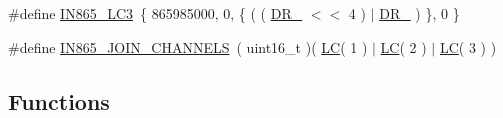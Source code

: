 \begin{DoxyCompactItemize}
\item 
\#define \hyperlink{group__REGIONIN865_ga6808f21aa6b28f6d31d32bc44c3ee52a}{I\+N865\+\_\+\+L\+C3}~\{ 865985000, 0, \{ ( ( \hyperlink{group__REGION_ga872e12c82020c02a7f70a1c6ed1375df}{D\+R\+\_} $<$$<$ 4 ) $\vert$ \hyperlink{group__REGION_ga6c4ef966b4f3d5eb7597b087f2b97095}{D\+R\+\_} ) \}, 0 \}
\item 
\#define \hyperlink{group__REGIONIN865_ga61dadd0a86c40e6fd4d47ffb08a1305e}{I\+N865\+\_\+\+J\+O\+I\+N\+\_\+\+C\+H\+A\+N\+N\+E\+LS}~( uint16\+\_\+t )( \hyperlink{group__REGION_ga12fa17e5c1016e01a9d82c25027deb1b}{LC}( 1 ) $\vert$ \hyperlink{group__REGION_ga12fa17e5c1016e01a9d82c25027deb1b}{LC}( 2 ) $\vert$ \hyperlink{group__REGION_ga12fa17e5c1016e01a9d82c25027deb1b}{LC}( 3 ) )
\end{DoxyCompactItemize}
\subsection*{Functions}
